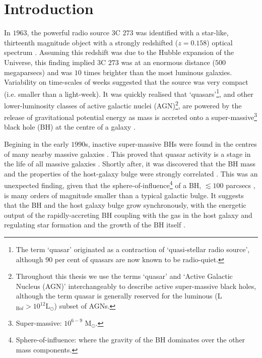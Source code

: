 
\chapter{Introduction}
\label{ch:intro}



In $1963$, the powerful radio source $3$C $273$ was identified with a star-like, thirteenth magnitude object with a strongly redshifted ($z=0.158$) optical spectrum \citep{schmidt63}. 
Assuming this redshift was due to the Hubble expansion of the Universe, this finding implied $3$C $273$ was at an enormous distance ($500$ megaparsecs) and was $10$ times brighter than the most luminous galaxies. 
Variability on time-scales of weeks suggested that the source was very compact (i.e. smaller than a light-week).
It was quickly realised that `quasars'\footnote{The term `quasar' originated as a contraction of `quasi-stellar radio source', although 90 per cent of quasars are now known to be radio-quiet.}, and other lower-luminosity classes of active galactic nuclei (AGN)\footnote{Throughout this thesis we use the terms `quasar' and `Active Galactic Nucleus (AGN)' interchangeably to describe active super-massive black holes, although the term quasar is generally reserved for the luminous (L$_{\mathrm Bol} > 10^{12}{\mathrm L}_{\odot}$) subset of AGNs.}, are powered by the release of gravitational potential energy as mass is accreted onto a super-massive\footnote{Super-massive: $10^{6 - 9}$ M$_\odot$.} black hole (BH) at the centre of a galaxy \citep[e.g.][]{hoyle63,salpeter64,lynden-bell69,lynden-bell71}. 

Begining in the early $1990$s, inactive super-massive BHs were found in the centres of many nearby massive galaxies \citep[e.g.][]{kormendy95,ferrarese05,kormendy13}.
This proved that quasar activity is a stage in the life of all massive galaxies \citep[e.g.][]{lynden-bell69}. 
Shortly after, it was discovered that the BH mass and the properties of the host-galaxy bulge were strongly correlated \citep[e.g. the BH mass and the stellar velocity dispersion in the host galaxy bulge, M$_{\mathrm BH}$-$\sigma$;][]{ferrarese00,gebhardt00,graham01,tremaine02,marconi03,aller07,gultekin09}.
This was an unexpected finding, given that the sphere-of-influence\footnote{Sphere-of-influence: where the gravity of the BH dominates over the other mass components.} of a BH, $\lesssim100$ parcsecs \citep[e.g.][]{kormendy13}, is many orders of magnitude smaller than a typical galactic bulge. 
It suggests that the BH and the host galaxy bulge grow synchronously, with the energetic output of the rapidly-accreting BH coupling with the gas in the host galaxy and regulating star formation and the growth of the BH itself \citep[e.g.][]{silk98,king03,dimatteo05,king15}. 

